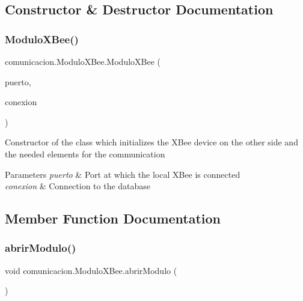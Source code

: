 \subsection{Constructor \& Destructor Documentation}
\mbox{\label{classcomunicacion_1_1_modulo_x_bee_aaea76284c0f4a44f4223888c9a8b44ea}} 
\subsubsection{\texorpdfstring{Modulo\+X\+Bee()}{ModuloXBee()}}
{\footnotesize\ttfamily comunicacion.\+Modulo\+X\+Bee.\+Modulo\+X\+Bee (\begin{DoxyParamCaption}\item[{String}]{puerto,  }\item[{\mbox{\hyperlink{classconexion_s_q_l_1_1_my_data_access}{My\+Data\+Access}}}]{conexion }\end{DoxyParamCaption})\hspace{0.3cm}{\ttfamily [inline]}}

Constructor of the class which initializes the X\+Bee device on the other side and the needed elements for the communication 
\begin{DoxyParams}{Parameters}
{\em puerto} & Port at which the local X\+Bee is connected \\
\hline
{\em conexion} & Connection to the database \\
\hline
\end{DoxyParams}


\subsection{Member Function Documentation}
\mbox{\label{classcomunicacion_1_1_modulo_x_bee_a2d5ad79e8571f3a2daaf66e3b5df4351}} 
\subsubsection{\texorpdfstring{abrir\+Modulo()}{abrirModulo()}}
{\footnotesize\ttfamily void comunicacion.\+Modulo\+X\+Bee.\+abrir\+Modulo (\begin{DoxyParamCaption}{ }\end{DoxyParamCaption})\hspace{0.3cm}{\ttfamily [inline]}}

